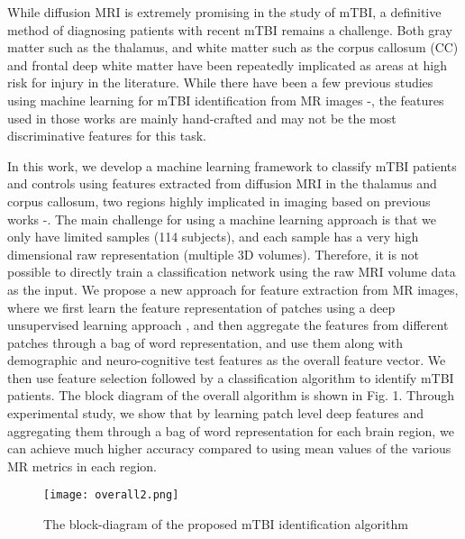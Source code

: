 \documentclass[letterpaper, 10 pt, conference]{ieeeconf}  %
\begin{document}
While diffusion MRI is extremely promising in the study of mTBI, a definitive method of diagnosing patients with recent mTBI remains a challenge.
Both gray matter such as the thalamus, and white matter such as the corpus callosum (CC) and frontal deep white matter have been repeatedly implicated as areas at high risk for injury in the literature.
While there have been a few previous studies using machine learning for mTBI identification from MR images \cite{yuanyi}-\cite{minaee2},  the features used in those works are mainly hand-crafted and may  not be the most discriminative features for this task.


In this work, we develop a machine learning framework to classify mTBI patients and controls using features extracted from diffusion MRI in the thalamus and corpus callosum, two regions highly implicated in imaging based on previous works \cite{thal}-\cite{cc}.
The main challenge for using a machine learning approach is that we only have limited samples (114 subjects), and each sample has a very high dimensional raw representation (multiple 3D volumes). Therefore, it is not possible to directly train a classification network using the raw MRI volume data as the input.
We  propose a new approach for feature extraction from MR images, where  we first learn the feature representation of patches using a deep unsupervised learning approach \cite{dnn}, and then aggregate the features from different patches through a bag of word representation, and use them along with demographic and neuro-cognitive test features as the overall feature vector.
We then use feature selection followed by a classification algorithm to identify mTBI patients.
The block diagram of the overall algorithm is shown in Fig. 1.
Through experimental study, we show that by learning patch level deep features and aggregating them through
a bag of word representation for each brain region, we can achieve much higher accuracy compared to using mean values of the various MR metrics in each region.
\begin{figure}[h]
\begin{center}
    \texttt{[image: overall2.png]}
\end{center}
  \caption{The block-diagram of the proposed mTBI identification algorithm}
\end{figure}
\end{document}
